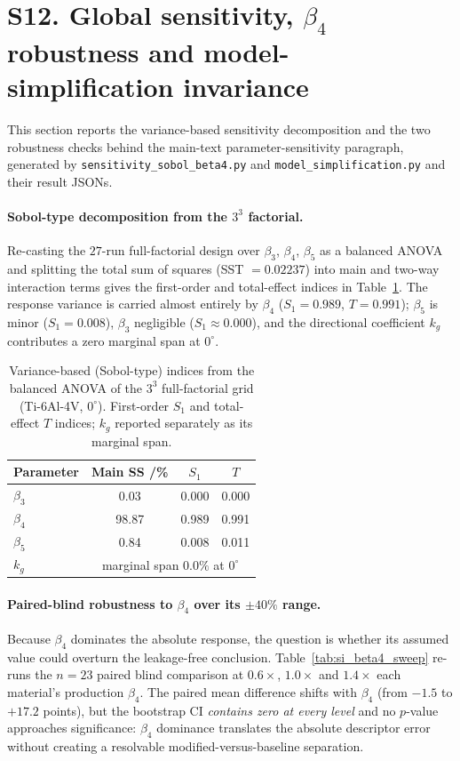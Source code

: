 \documentclass[12pt,a4paper,twocolumn]{article}
\providecommand{\ang}[1]{\ensuremath{#1^{\circ}}}
\begin{document}
\section*{S12. Global sensitivity, $\beta_4$ robustness and model-simplification invariance}

This section reports the variance-based sensitivity decomposition and the two robustness checks behind the
main-text parameter-sensitivity paragraph, generated by \texttt{sensitivity\_sobol\_beta4.py} and
\texttt{model\_simplification.py} and their result JSONs.

\paragraph{Sobol-type decomposition from the $3^3$ factorial.}
Re-casting the $27$-run full-factorial design over $\beta_3$, $\beta_4$, $\beta_5$ as a balanced ANOVA and
splitting the total sum of squares (SST $= 0.02237$) into main and two-way interaction terms gives the
first-order and total-effect indices in Table~\ref{tab:si_sobol}. The response variance is carried almost
entirely by $\beta_4$ ($S_1 = 0.989$, $T = 0.991$); $\beta_5$ is minor ($S_1 = 0.008$), $\beta_3$ negligible
($S_1 \approx 0.000$), and the directional coefficient $k_g$ contributes a zero marginal span at $\ang{0}$.

\begin{table}[htbp]
\centering
\caption{Variance-based (Sobol-type) indices from the balanced ANOVA of the $3^3$ full-factorial grid
(Ti-6Al-4V, $\ang{0}$). First-order $S_1$ and total-effect $T$ indices; $k_g$ reported separately as its
marginal span.}
\label{tab:si_sobol}
\footnotesize
\begin{tabular}{lccc}
\toprule
\textbf{Parameter} & \textbf{Main SS /\%} & $S_1$ & $T$ \\
\midrule
$\beta_3$ & 0.03 & 0.000 & 0.000 \\
$\beta_4$ & 98.87 & 0.989 & 0.991 \\
$\beta_5$ & 0.84 & 0.008 & 0.011 \\
$k_g$ & \multicolumn{3}{c}{marginal span $0.0\%$ at $\ang{0}$} \\
\bottomrule
\end{tabular}
\end{table}

\paragraph{Paired-blind robustness to $\beta_4$ over its $\pm40\%$ range.}
Because $\beta_4$ dominates the absolute response, the question is whether its assumed value could overturn
the leakage-free conclusion. Table~\ref{tab:si_beta4_sweep} re-runs the $n = 23$ paired blind comparison at
$0.6\times$, $1.0\times$ and $1.4\times$ each material's production $\beta_4$. The paired mean difference shifts
with $\beta_4$ (from $-1.5$ to $+17.2$ points), but the bootstrap CI \emph{contains zero at every level} and no
$p$-value approaches significance: $\beta_4$ dominance translates the absolute descriptor error without
creating a resolvable modified-versus-baseline separation.
\end{document}
